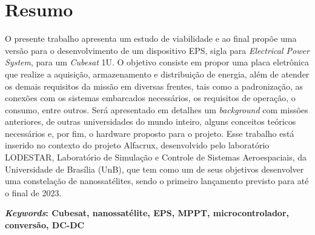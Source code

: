\chapter*{Resumo}
O presente trabalho apresenta um estudo de viabilidade e ao final propõe uma versão para o desenvolvimento de um dispositivo EPS, sigla para \textit{Electrical Power System}, para um \textit{Cubesat} 1U. O objetivo consiste em propor uma placa eletrônica que realize a aquisição, armazenamento e distribuição de energia, além de atender os demais requisitos da missão em diversas frentes, tais como a padronização, as conexões com os sistemas embarcados necessários, os requisitos de operação, o consumo, entre outros. Será apresentado em detalhes um \textit{background} com missões anteriores, de outras universidades do mundo inteiro, alguns conceitos teóricos necessários e, por fim, o hardware proposto para o projeto. Esse trabalho está inserido no contexto do projeto Alfacrux, desenvolvido pelo laboratório LODESTAR, Laboratório de Simulação e Controle de Sistemas Aeroespaciais, da Universidade de Brasília (UnB), que tem como um de seus objetivos desenvolver uma constelação de nanossatélites, sendo o primeiro lançamento previsto para até o final de 2023. 

\textbf{\textit{Keywords}: Cubesat, nanossatélite, EPS, MPPT, microcontrolador, conversão, DC-DC}
